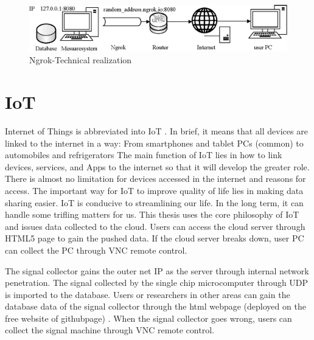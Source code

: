 \begin{figure}[!ht]
	\centering
	\includegraphics[width=15cm]{grafiken/2.15.eps}
	\caption{Ngrok-Technical realization} 
	\label{fig:2.15}
\end{figure}
\FloatBarrier

\section{IoT}
\label{sec:IoT}
Internet of Things is abbreviated into IoT \cite{lee2015internet}. 
In brief, it means that all devices are linked to the internet in a way: 
From smartphones and tablet PCs (common) to automobiles and refrigerators 
The main function of IoT lies in how to link devices, services, and Apps to the internet so that it will develop the greater role. There is almost no limitation for devices accessed in the internet and reasons for access. 
The important way for IoT to improve quality of life lies in making data sharing easier. IoT is conducive to streamlining our life. In the long term, it can handle some trifling matters for us. 
This thesis uses the core philosophy of IoT and issues data collected to the cloud. Users can access the cloud server through HTML5 page to gain the pushed data. If the cloud server breaks down, user PC can collect the PC through VNC remote control. 

The signal collector gains the outer net IP as the server through internal network penetration. The signal collected by the single chip microcomputer through UDP is imported to the database. Users or researchers in other areas can gain the database data of the signal collector through the html webpage (deployed on the free website of githubpage) \cite{borges2016understanding}. When the signal collector goes wrong, users can collect the signal machine through VNC remote control. 


